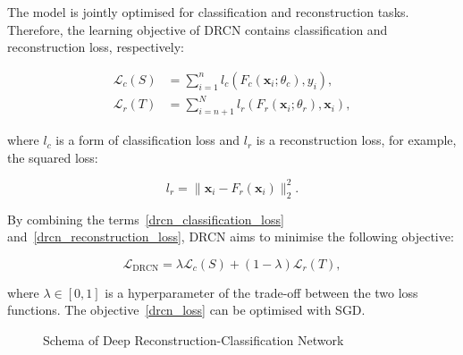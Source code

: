 The model is jointly optimised for classification and reconstruction tasks.
Therefore, the learning objective of DRCN contains classification and reconstruction loss, respectively:

\begin{align}
	\mathcal{L}_c(S) &= \sum_{i = 1}^{n}
	l_c(F_c(\mathbf{x}_i; \theta_c), y_i),
	\label{drcn_classification_loss} \\
	\mathcal{L}_r(T) &= \sum_{i = n + 1}^{N}
	l_r(F_r(\mathbf{x}_i; \theta_r), \mathbf{x}_i),
	\label{drcn_reconstruction_loss}
\end{align}

where \(l_c\) is a form of classification loss
and \(l_r\) is a reconstruction loss, for example, the squared loss:

\begin{equation}
	l_r = \|\mathbf{x}_i - F_r(\mathbf{x}_i)\|_2^2.
\end{equation}

By combining the terms~\ref{drcn_classification_loss} and~\ref{drcn_reconstruction_loss},
DRCN aims to minimise the following objective:

\begin{equation}
	\mathcal{L}_{\mathrm{DRCN}}
	= \lambda \mathcal{L}_c(S) + (1 - \lambda) \mathcal{L}_r(T),
	\label{drcn_loss}
\end{equation}

where \(\lambda \in [0, 1]\) is a hyperparameter of the trade-off between the two loss functions.
The objective~\ref{drcn_loss} can be optimised with SGD.

\begin{figure}
\begin{center}
\end{center}
\caption{Schema of Deep Reconstruction-Classification Network}
\end{figure}

